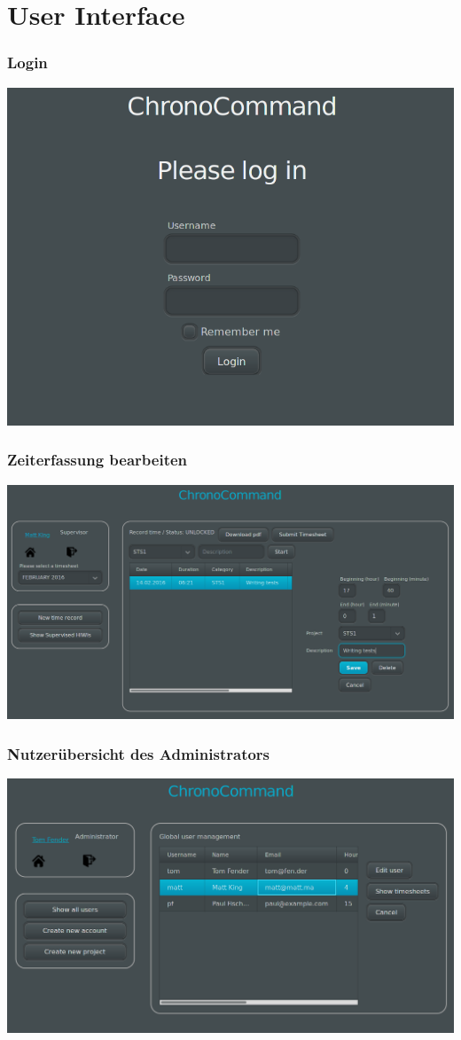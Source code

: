 


\usepackage[table]{xcolor}



\section{User Interface}
\begin{frame}
	\frametitle{Login}
	\includegraphics{images/login.png}
\end{frame}

\begin{frame}
	\frametitle{Zeiterfassung bearbeiten}
	\includegraphics{images/timerecord-edit.png}
\end{frame}

\begin{frame}
	\frametitle{Nutzerübersicht des Administrators}
	\includegraphics{images/admin-overview.png}
\end{frame}

